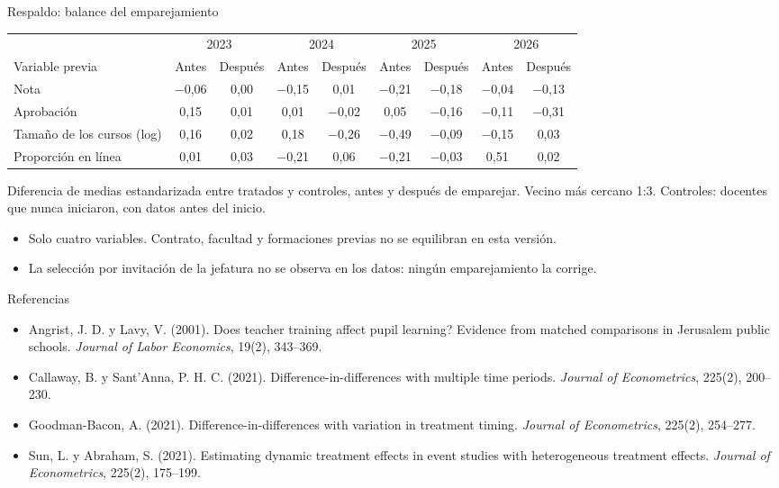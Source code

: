 \documentclass[10pt,aspectratio=169]{beamer}
\begin{document}
\begin{frame}{Respaldo: balance del emparejamiento}
  \begin{table}\scriptsize
    \begin{tabular}{lcccccccc}
      \toprule
      & \multicolumn{2}{c}{2023} & \multicolumn{2}{c}{2024} & \multicolumn{2}{c}{2025} & \multicolumn{2}{c}{2026} \\
      \cmidrule(lr){2-3}\cmidrule(lr){4-5}\cmidrule(lr){6-7}\cmidrule(lr){8-9}
      Variable previa & Antes & Después & Antes & Después & Antes & Después & Antes & Después \\
      \midrule
      Nota & $-$0,06 & 0,00 & $-$0,15 & 0,01 & $-$0,21 & $-$0,18 & $-$0,04 & $-$0,13 \\
      Aprobación & 0,15 & 0,01 & 0,01 & $-$0,02 & 0,05 & $-$0,16 & $-$0,11 & $-$0,31 \\
      Tamaño de los cursos (log) & 0,16 & 0,02 & 0,18 & $-$0,26 & $-$0,49 & $-$0,09 & $-$0,15 & 0,03 \\
      Proporción en línea & 0,01 & 0,03 & $-$0,21 & 0,06 & $-$0,21 & $-$0,03 & 0,51 & 0,02 \\
      \bottomrule
    \end{tabular}
  \end{table}
  {\scriptsize Diferencia de medias estandarizada entre tratados y controles, antes y después de emparejar. Vecino más cercano 1:3. Controles: docentes que nunca iniciaron, con datos antes del inicio.}
  \vspace{0.4em}
  \begin{itemize}\small
    \item Solo cuatro variables. Contrato, facultad y formaciones previas no se equilibran en esta versión.
    \item La selección por invitación de la jefatura no se observa en los datos: ningún emparejamiento la corrige.
  \end{itemize}
\end{frame}

\begin{frame}{Referencias}
  \small
  \begin{itemize}
    \item Angrist, J. D. y Lavy, V. (2001). Does teacher training affect pupil learning? Evidence from matched comparisons in Jerusalem public schools. \emph{Journal of Labor Economics}, 19(2), 343--369.
    \item Callaway, B. y Sant'Anna, P. H. C. (2021). Difference-in-differences with multiple time periods. \emph{Journal of Econometrics}, 225(2), 200--230.
    \item Goodman-Bacon, A. (2021). Difference-in-differences with variation in treatment timing. \emph{Journal of Econometrics}, 225(2), 254--277.
    \item Sun, L. y Abraham, S. (2021). Estimating dynamic treatment effects in event studies with heterogeneous treatment effects. \emph{Journal of Econometrics}, 225(2), 175--199.
  \end{itemize}
\end{frame}
\end{document}
